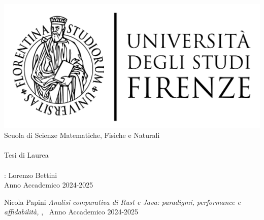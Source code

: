 \newcommand{\myFaculty}{
	Scuola di Scienze Matematiche, Fisiche e Naturali\xspace}
\newcommand{\myUni}{\protect{
	Università degli Studi di Firenze}\xspace}

\begin{titlepage}
	\begin{center}
   	\large
      \hfill
      \vfill
      \begingroup
         \includegraphics[scale=0.15]{logo/LOGO}\\
			\myFaculty \\
			\myDegree \\ 
			\vspace{0.5cm}
         \vspace{0.5cm}    
         Tesi di Laurea    
         \vspace{0.5cm}    
      \endgroup 
      \vfill 
      \begingroup
      	\color{Maroon} \\ $\ $\\
	\bigskip
	\bigskip
      \endgroup
      \vfill 
      \vfill
      \mySupervisorTitle: Lorenzo Bettini\\
      \vfill
	\bigskip
	\bigskip
      \vfill
      \vfill
      \vfill
      \vfill
      \vfill
      \vfill
      \vfill
      \vfill
      Anno Accademico 2024-2025
	\end{center}        
\end{titlepage}   
   \newpage
	\thispagestyle{empty}
	\hfill
	\vfill
	\noindent Nicola Papini
	\textit{Analisi comparativa di Rust e Java: paradigmi, performance e affidabilità,} 
	\myDegree, \textcopyright\ Anno Accademico 2024-2025
